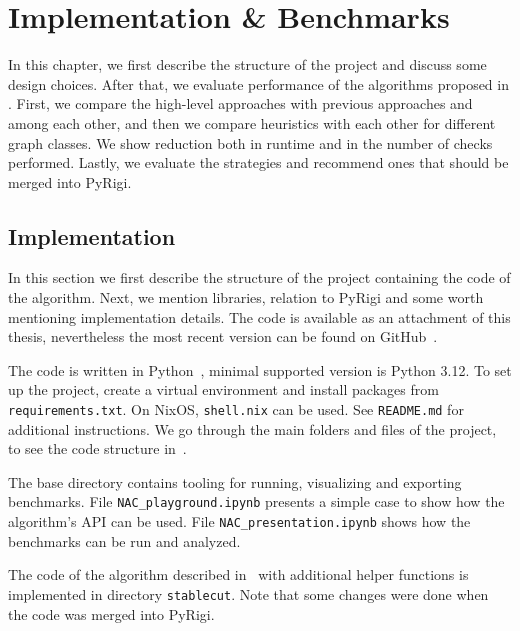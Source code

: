 \chapter{Implementation \& Benchmarks}%
\label{chapter:benchmarks}

\begin{chapterabstract}

	In this chapter, we first describe the structure of the project
	and discuss some design choices.
	After that, we evaluate performance of the algorithms
	proposed in .
	First, we compare the high-level approaches with previous approaches and among each other,
	and then we compare heuristics with each other
	for different  graph classes.
	We show reduction both in runtime and in the number
	of \IsNACColoring{} checks performed.
	Lastly, we evaluate the strategies and
	recommend ones that should be merged into PyRigi.

\end{chapterabstract}

\section{Implementation}


In this section we first describe the structure of the project containing
the code of the algorithm.
Next, we mention libraries, relation to PyRigi and
some worth mentioning implementation details.
The code is available as an attachment of this thesis,
nevertheless the most recent version can be found on GitHub~\cite{my_code}.

The code is written in Python~\cite{python}, minimal supported version is Python 3.12.
To set up the project, create a virtual environment and install packages
from \texttt{requirements.txt}. On NixOS, \texttt{shell.nix} can be used.
See \texttt{README.md} for additional instructions.
We go through the main folders and files of the project,
to see the code structure in~.

The base directory contains tooling for running, visualizing and exporting benchmarks.
File \texttt{NAC\_playground.ipynb} presents a simple case
to show how the algorithm's API can be used.
File \texttt{NAC\_presentation.ipynb} shows how the benchmarks can be run and analyzed.

The code of the algorithm described in~
with additional helper functions is implemented in directory \texttt{stablecut}.
Note that some changes were done when the code was merged into PyRigi.

